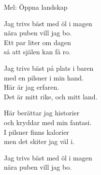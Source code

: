 \pagestyle{Öhlvisor}
\begin{SongText}[Trivsel]
    \begin{SongInfo}
        Mel: Öppna landskap
    \end{SongInfo}
    \begin{SongVerse}
        Jag trivs bäst med öl i magen\\%
        nära puben vill jag bo.\\%
        Ett par liter om dagen\\%
        så att själen kan få ro.
    \end{SongVerse}
    \begin{SongVerse}
        Jag trivs bäst på plats i baren\\%
        med en pilsner i min hand.\\%
        Här är jag erfaren.\\%
        Det är mitt rike, och mitt land.
    \end{SongVerse}
    \begin{SongVerse}
        Här berättar jag historier\\%
        och kryddar med min fantasi.\\%
        I pilsner finns kalorier\\%
        men det skiter jag väl i.
    \end{SongVerse}
    \begin{SongVerse}
        Jag trivs bäst med öl i magen\\%
        nära puben vill jag bo.
    \end{SongVerse}
\end{SongText}
